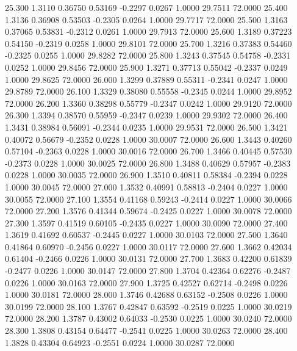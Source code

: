   25.300   1.3110   0.36750   0.53169  -0.2297   0.0267   1.0000  29.7511  72.0000
  25.400   1.3136   0.36908   0.53503  -0.2305   0.0264   1.0000  29.7717  72.0000
  25.500   1.3163   0.37065   0.53831  -0.2312   0.0261   1.0000  29.7913  72.0000
  25.600   1.3189   0.37223   0.54150  -0.2319   0.0258   1.0000  29.8101  72.0000
  25.700   1.3216   0.37383   0.54460  -0.2325   0.0255   1.0000  29.8282  72.0000
  25.800   1.3243   0.37545   0.54758  -0.2331   0.0252   1.0000  29.8456  72.0000
  25.900   1.3271   0.37713   0.55042  -0.2337   0.0249   1.0000  29.8625  72.0000
  26.000   1.3299   0.37889   0.55311  -0.2341   0.0247   1.0000  29.8789  72.0000
  26.100   1.3329   0.38080   0.55558  -0.2345   0.0244   1.0000  29.8952  72.0000
  26.200   1.3360   0.38298   0.55779  -0.2347   0.0242   1.0000  29.9120  72.0000
  26.300   1.3394   0.38570   0.55959  -0.2347   0.0239   1.0000  29.9302  72.0000
  26.400   1.3431   0.38984   0.56091  -0.2344   0.0235   1.0000  29.9531  72.0000
  26.500   1.3421   0.40072   0.56679  -0.2352   0.0228   1.0000  30.0007  72.0000
  26.600   1.3443   0.40260   0.57104  -0.2363   0.0228   1.0000  30.0016  72.0000
  26.700   1.3466   0.40445   0.57530  -0.2373   0.0228   1.0000  30.0025  72.0000
  26.800   1.3488   0.40629   0.57957  -0.2383   0.0228   1.0000  30.0035  72.0000
  26.900   1.3510   0.40811   0.58384  -0.2394   0.0228   1.0000  30.0045  72.0000
  27.000   1.3532   0.40991   0.58813  -0.2404   0.0227   1.0000  30.0055  72.0000
  27.100   1.3554   0.41168   0.59243  -0.2414   0.0227   1.0000  30.0066  72.0000
  27.200   1.3576   0.41344   0.59674  -0.2425   0.0227   1.0000  30.0078  72.0000
  27.300   1.3597   0.41519   0.60105  -0.2435   0.0227   1.0000  30.0090  72.0000
  27.400   1.3619   0.41692   0.60537  -0.2445   0.0227   1.0000  30.0103  72.0000
  27.500   1.3640   0.41864   0.60970  -0.2456   0.0227   1.0000  30.0117  72.0000
  27.600   1.3662   0.42034   0.61404  -0.2466   0.0226   1.0000  30.0131  72.0000
  27.700   1.3683   0.42200   0.61839  -0.2477   0.0226   1.0000  30.0147  72.0000
  27.800   1.3704   0.42364   0.62276  -0.2487   0.0226   1.0000  30.0163  72.0000
  27.900   1.3725   0.42527   0.62714  -0.2498   0.0226   1.0000  30.0181  72.0000
  28.000   1.3746   0.42688   0.63152  -0.2508   0.0226   1.0000  30.0199  72.0000
  28.100   1.3767   0.42847   0.63592  -0.2519   0.0225   1.0000  30.0219  72.0000
  28.200   1.3787   0.43002   0.64033  -0.2530   0.0225   1.0000  30.0240  72.0000
  28.300   1.3808   0.43154   0.64477  -0.2541   0.0225   1.0000  30.0263  72.0000
  28.400   1.3828   0.43304   0.64923  -0.2551   0.0224   1.0000  30.0287  72.0000

